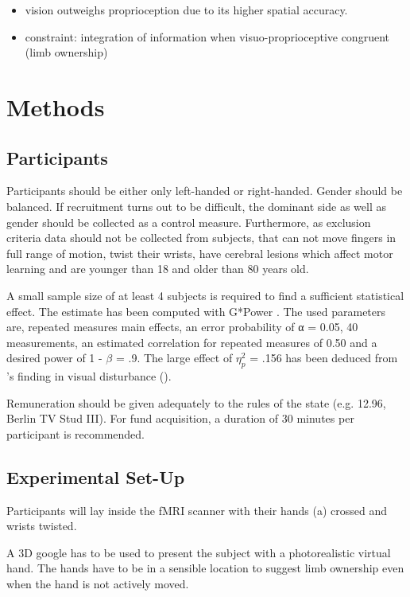 \documentclass[man]{apa7}
\begin{document}
\begin{itemize}
    \item vision outweighs proprioception due to its higher spatial accuracy.
    \item constraint: integration of information when visuo-proprioceptive congruent (limb ownership)
\end{itemize}

\parencite{Limanowski2016}


\section{Methods}
\subsection{Participants}

Participants should be either only left-handed or right-handed. Gender should be balanced. If recruitment turns out to be difficult, the dominant side as well as gender should be collected as a control measure. Furthermore, as exclusion criteria data should not be collected from subjects, that can not move fingers in full range of motion, twist their wrists, have cerebral lesions which affect motor learning and are younger than 18 and older than 80 years old.

A small sample size of at least 4 subjects is required to find a sufficient statistical effect. The estimate has been computed with G*Power \parencite{erdfelder1996gpower}. The used parameters are, repeated measures main effects, an error probability of α = 0.05, 40 measurements, an estimated correlation for repeated measures of 0.50 and a desired power of 1 - $\beta$ = .9. The large effect of $\eta^2_p$ = .156 has been deduced from \citeauthor{Wei2009}'s finding in visual disturbance (\citeyear{Wei2009}).

Remuneration should be given adequately to the rules of the state (e.g. 12.96, Berlin TV Stud III). For fund acquisition, a duration of 30 minutes per participant is recommended.

\subsection{Experimental Set-Up}

Participants will lay inside the fMRI scanner with their hands (a) crossed and wrists twisted.

A 3D google has to be used to present the subject with a photorealistic virtual hand. The hands have to be in a sensible location to suggest limb ownership even when the hand is not actively moved.
\end{document}
